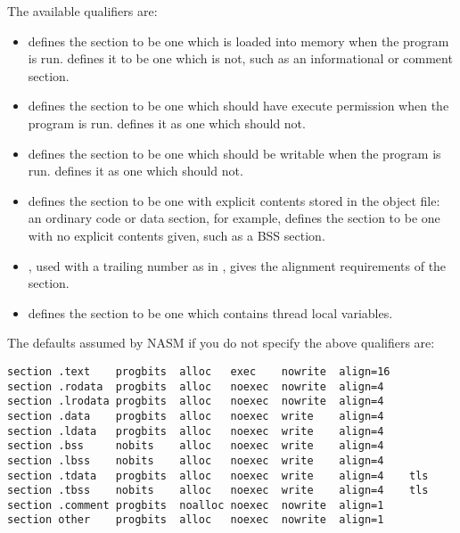 The available qualifiers are:

\begin{itemize}
    \item{ defines the section to be one which is loaded into
        memory when the program is run.  defines it to be one
        which is not, such as an informational or comment section.}

    \item{ defines the section to be one which should have execute
        permission when the program is run.  defines it as one
        which should not.}

    \item{ defines the section to be one which should be writable
        when the program is run.  defines it as one which should
        not.}

    \item{ defines the section to be one with explicit contents
        stored in the object file: an ordinary code or data section, for
        example,  defines the section to be one with no explicit
        contents given, such as a BSS section.}

    \item{, used with a trailing number as in , gives the
        alignment
        requirements of the section.}

    \item{ defines the section to be one which contains
        thread local variables.}
\end{itemize}

The defaults assumed by NASM if you do not specify the above
qualifiers are:
  
  
  

\begin{lstlisting}
section .text    progbits  alloc   exec    nowrite  align=16
section .rodata  progbits  alloc   noexec  nowrite  align=4
section .lrodata progbits  alloc   noexec  nowrite  align=4
section .data    progbits  alloc   noexec  write    align=4
section .ldata   progbits  alloc   noexec  write    align=4
section .bss     nobits    alloc   noexec  write    align=4
section .lbss    nobits    alloc   noexec  write    align=4
section .tdata   progbits  alloc   noexec  write    align=4    tls
section .tbss    nobits    alloc   noexec  write    align=4    tls
section .comment progbits  noalloc noexec  nowrite  align=1
section other    progbits  alloc   noexec  nowrite  align=1
\end{lstlisting}

